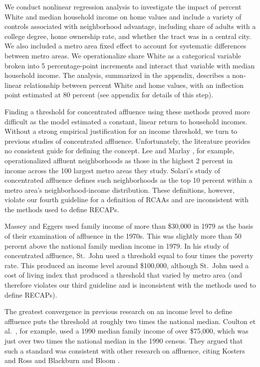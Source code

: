 \documentclass[11pt,]{article}
\begin{document}
We conduct nonlinear regression analysis to investigate the impact of
percent White and median household income on home values and include a
variety of controls associated with neighborhood advantage, including
share of adults with a college degree, home ownership rate, and whether
the tract was in a central city. We also included a metro area fixed
effect to account for systematic differences between metro areas. We
operationalize share White as a categorical variable broken into 5
percentage-point increments and interact that variable with median
household income. The analysis, summarized in the appendix, describes a
non-linear relationship between percent White and home values, with an
inflection point estimated at 80 percent (see appendix for details of
this step).

Finding a threshold for concentrated affluence using these methods
proved more difficult as the model estimated a constant, linear return
to household incomes. Without a strong empirical justification for an
income threshold, we turn to previous studies of concentrated affluence.
Unfortunately, the literature provides no consistent guide for defining
the concept. Lee and Marlay \autocite*{lee2007right}, for example,
operationalized affluent neighborhoods as those in the highest 2 percent
in income across the 100 largest metro areas they study. Solari's
\autocite*{solari2012} study of concentrated affluence defines such
neighborhoods as the top 10 percent within a metro area's
neighborhood-income distribution. These definitions, however, violate
our fourth guideline for a definition of RCAAs and are inconsistent with
the methods used to define RECAPs.

Massey and Eggers used family income of more than \$30,000 in 1979 as
the basis of their examination of affluence in the 1970s. This was
slightly more than 50 percent above the national family median income in
1979. In his study of concentrated affluence, St.~John used a threshold
equal to four times the poverty rate. This produced an income level
around \$100,000, although St.~John used a cost of living index that
produced a threshold that varied by metro area (and therefore violates
our third guideline and is inconsistent with the methods used to define
RECAPs).

The greatest convergence in previous research on an income level to
define affluence puts the threshold at roughly two times the national
median. Coulton et al.~\autocite*{coulton1996}, for example, used a 1990
median family income of over \$75,000, which was just over two times the
national median in the 1990 census. They argued that such a standard was
consistent with other research on affluence, citing Kosters and Ross
\autocite*{kosters1988shrinking} and Blackburn and Bloom
\autocite*{blackburn1985h}.
\end{document}
